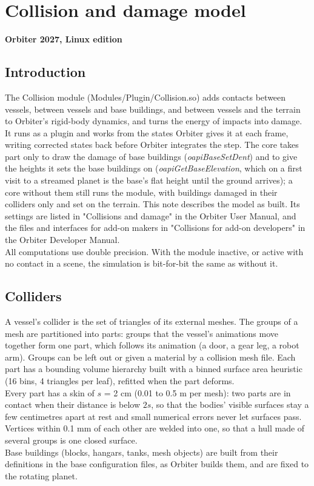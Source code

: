 \documentclass[Orbiter Technical Reference.tex]{subfiles}
\begin{document}
\section{Collision and damage model}
\textbf{Orbiter 2027, Linux edition}


\subsection{Introduction}
The Collision module (Modules/Plugin/Collision.so) adds contacts between vessels, between vessels and base buildings, and between vessels and the terrain to Orbiter's rigid-body dynamics, and turns the energy of impacts into damage. It runs as a plugin and works from the states Orbiter gives it at each frame, writing corrected states back before Orbiter integrates the step. The core takes part only to draw the damage of base buildings (\textit{oapiBaseSetDent}) and to give the heights it sets the base buildings on (\textit{oapiGetBaseElevation}, which on a first visit to a streamed planet is the base's flat height until the ground arrives); a core without them still runs the module, with buildings damaged in their colliders only and set on the terrain. This note describes the model as built. Its settings are listed in "Collisions and damage" in the Orbiter User Manual, and the files and interfaces for add-on makers in "Collisions for add-on developers" in the Orbiter Developer Manual.\\
All computations use double precision. With the module inactive, or active with no contact in a scene, the simulation is bit-for-bit the same as without it.


\subsection{Colliders}
A vessel's collider is the set of triangles of its external meshes. The groups of a mesh are partitioned into parts: groups that the vessel's animations move together form one part, which follows its animation (a door, a gear leg, a robot arm). Groups can be left out or given a material by a collision mesh file. Each part has a bounding volume hierarchy built with a binned surface area heuristic (16 bins, 4 triangles per leaf), refitted when the part deforms.\\
Every part has a skin of $s$ = 2 cm (0.01 to 0.5 m per mesh): two parts are in contact when their distance is below $2s$, so that the bodies' visible surfaces stay a few centimetres apart at rest and small numerical errors never let surfaces pass. Vertices within 0.1 mm of each other are welded into one, so that a hull made of several groups is one closed surface.\\
Base buildings (blocks, hangars, tanks, mesh objects) are built from their definitions in the base configuration files, as Orbiter builds them, and are fixed to the rotating planet.
\end{document}
